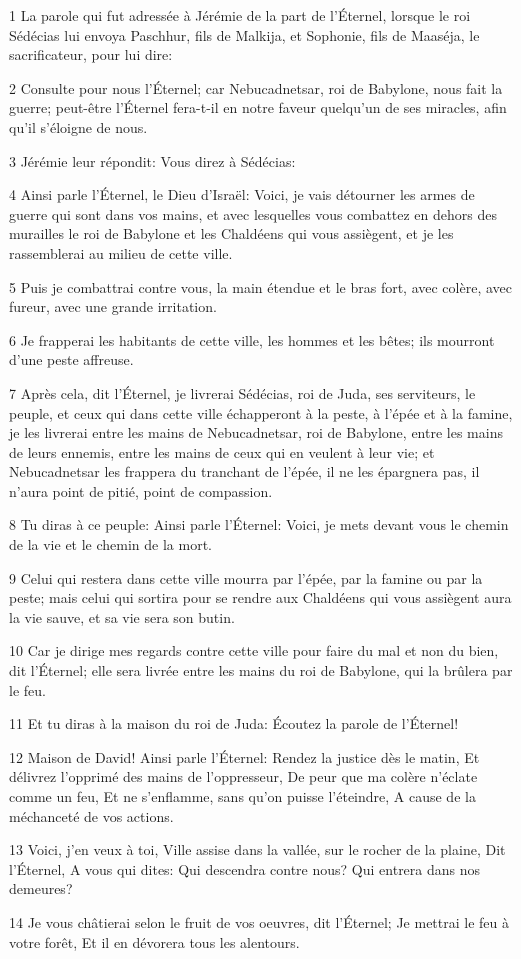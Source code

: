 \par 1 La parole qui fut adressée à Jérémie de la part de l'Éternel, lorsque le roi Sédécias lui envoya Paschhur, fils de Malkija, et Sophonie, fils de Maaséja, le sacrificateur, pour lui dire:
\par 2 Consulte pour nous l'Éternel; car Nebucadnetsar, roi de Babylone, nous fait la guerre; peut-être l'Éternel fera-t-il en notre faveur quelqu'un de ses miracles, afin qu'il s'éloigne de nous.
\par 3 Jérémie leur répondit: Vous direz à Sédécias:
\par 4 Ainsi parle l'Éternel, le Dieu d'Israël: Voici, je vais détourner les armes de guerre qui sont dans vos mains, et avec lesquelles vous combattez en dehors des murailles le roi de Babylone et les Chaldéens qui vous assiègent, et je les rassemblerai au milieu de cette ville.
\par 5 Puis je combattrai contre vous, la main étendue et le bras fort, avec colère, avec fureur, avec une grande irritation.
\par 6 Je frapperai les habitants de cette ville, les hommes et les bêtes; ils mourront d'une peste affreuse.
\par 7 Après cela, dit l'Éternel, je livrerai Sédécias, roi de Juda, ses serviteurs, le peuple, et ceux qui dans cette ville échapperont à la peste, à l'épée et à la famine, je les livrerai entre les mains de Nebucadnetsar, roi de Babylone, entre les mains de leurs ennemis, entre les mains de ceux qui en veulent à leur vie; et Nebucadnetsar les frappera du tranchant de l'épée, il ne les épargnera pas, il n'aura point de pitié, point de compassion.
\par 8 Tu diras à ce peuple: Ainsi parle l'Éternel: Voici, je mets devant vous le chemin de la vie et le chemin de la mort.
\par 9 Celui qui restera dans cette ville mourra par l'épée, par la famine ou par la peste; mais celui qui sortira pour se rendre aux Chaldéens qui vous assiègent aura la vie sauve, et sa vie sera son butin.
\par 10 Car je dirige mes regards contre cette ville pour faire du mal et non du bien, dit l'Éternel; elle sera livrée entre les mains du roi de Babylone, qui la brûlera par le feu.
\par 11 Et tu diras à la maison du roi de Juda: Écoutez la parole de l'Éternel!
\par 12 Maison de David! Ainsi parle l'Éternel: Rendez la justice dès le matin, Et délivrez l'opprimé des mains de l'oppresseur, De peur que ma colère n'éclate comme un feu, Et ne s'enflamme, sans qu'on puisse l'éteindre, A cause de la méchanceté de vos actions.
\par 13 Voici, j'en veux à toi, Ville assise dans la vallée, sur le rocher de la plaine, Dit l'Éternel, A vous qui dites: Qui descendra contre nous? Qui entrera dans nos demeures?
\par 14 Je vous châtierai selon le fruit de vos oeuvres, dit l'Éternel; Je mettrai le feu à votre forêt, Et il en dévorera tous les alentours.

